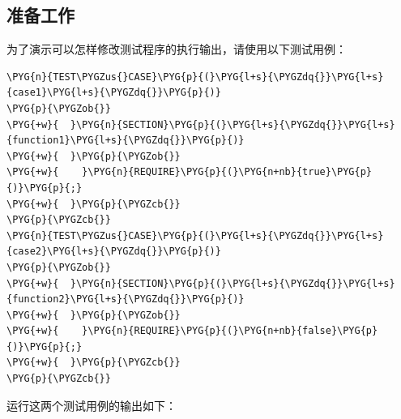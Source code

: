 
\subsection{准备工作}



为了演示可以怎样修改测试程序的执行输出，请使用以下测试用例：



\begin{codeblockbg}
\begin{Verbatim}[commandchars=\\\{\},breaklines=true,breakanywhere=true,fontsize=\codefont,xleftmargin=17bp]
\PYG{n}{TEST\PYGZus{}CASE}\PYG{p}{(}\PYG{l+s}{\PYGZdq{}}\PYG{l+s}{case1}\PYG{l+s}{\PYGZdq{}}\PYG{p}{)}
\PYG{p}{\PYGZob{}}
\PYG{+w}{  }\PYG{n}{SECTION}\PYG{p}{(}\PYG{l+s}{\PYGZdq{}}\PYG{l+s}{function1}\PYG{l+s}{\PYGZdq{}}\PYG{p}{)}
\PYG{+w}{  }\PYG{p}{\PYGZob{}}
\PYG{+w}{    }\PYG{n}{REQUIRE}\PYG{p}{(}\PYG{n+nb}{true}\PYG{p}{)}\PYG{p}{;}
\PYG{+w}{  }\PYG{p}{\PYGZcb{}}
\PYG{p}{\PYGZcb{}}
\PYG{n}{TEST\PYGZus{}CASE}\PYG{p}{(}\PYG{l+s}{\PYGZdq{}}\PYG{l+s}{case2}\PYG{l+s}{\PYGZdq{}}\PYG{p}{)}
\PYG{p}{\PYGZob{}}
\PYG{+w}{  }\PYG{n}{SECTION}\PYG{p}{(}\PYG{l+s}{\PYGZdq{}}\PYG{l+s}{function2}\PYG{l+s}{\PYGZdq{}}\PYG{p}{)}
\PYG{+w}{  }\PYG{p}{\PYGZob{}}
\PYG{+w}{    }\PYG{n}{REQUIRE}\PYG{p}{(}\PYG{n+nb}{false}\PYG{p}{)}\PYG{p}{;}
\PYG{+w}{  }\PYG{p}{\PYGZcb{}}
\PYG{p}{\PYGZcb{}}
\end{Verbatim}
\end{codeblockbg}



运行这两个测试用例的输出如下：



